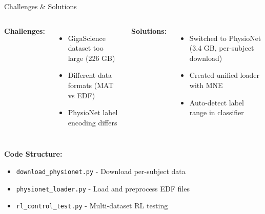 \documentclass[aspectratio=169, 11pt]{beamer}
\begin{document}
\begin{frame}{Challenges \& Solutions}
    \begin{columns}[T]
        \textbf{Challenges:}
        \begin{itemize}
            \item GigaScience dataset too large (226 GB)
            \item Different data formats (MAT vs EDF)
            \item PhysioNet label encoding differs
        \end{itemize}
        
        \textbf{Solutions:}
        \begin{itemize}
            \item Switched to PhysioNet (3.4 GB, per-subject download)
            \item Created unified loader with MNE
            \item Auto-detect label range in classifier
        \end{itemize}
    \end{columns}
    
    \vspace{5mm}
    \textbf{Code Structure:}
    \begin{itemize}
        \item \texttt{download\_physionet.py} - Download per-subject data
        \item \texttt{physionet\_loader.py} - Load and preprocess EDF files
        \item \texttt{rl\_control\_test.py} - Multi-dataset RL testing
    \end{itemize}
\end{frame}
\end{document}
